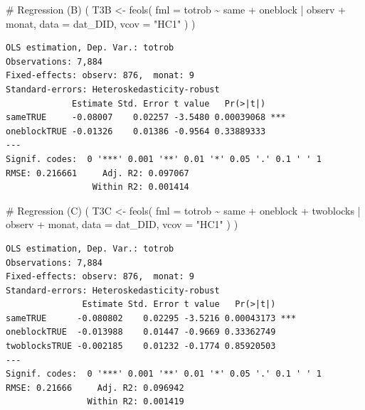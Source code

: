 \documentclass[
  a4paper,
  DIV=11,
  oneside]{scrreprt}
\newenvironment{Shaded}{\begin{snugshade}}{\end{snugshade}}
\newcommand{\AttributeTok}[1]{\textcolor[rgb]{0.40,0.45,0.13}{#1}}
\newcommand{\CommentTok}[1]{\textcolor[rgb]{0.37,0.37,0.37}{#1}}
\newcommand{\FunctionTok}[1]{\textcolor[rgb]{0.28,0.35,0.67}{#1}}
\newcommand{\NormalTok}[1]{\textcolor[rgb]{0.00,0.23,0.31}{#1}}
\newcommand{\OtherTok}[1]{\textcolor[rgb]{0.00,0.23,0.31}{#1}}
\newcommand{\SpecialCharTok}[1]{\textcolor[rgb]{0.37,0.37,0.37}{#1}}
\newcommand{\StringTok}[1]{\textcolor[rgb]{0.13,0.47,0.30}{#1}}
\begin{document}
\begin{Shaded}
\begin{Highlighting}[]
\CommentTok{\# Regression (B)}
\NormalTok{(}
\NormalTok{  T3B }\OtherTok{\textless{}{-}} \FunctionTok{feols}\NormalTok{(}
    \AttributeTok{fml =}\NormalTok{ totrob }\SpecialCharTok{\textasciitilde{}} 
\NormalTok{      same  }
    \SpecialCharTok{+}\NormalTok{ oneblock }
    \SpecialCharTok{|}\NormalTok{ observ }\SpecialCharTok{+}\NormalTok{ monat, }
    \AttributeTok{data =}\NormalTok{ dat\_DID, }
    \AttributeTok{vcov =} \StringTok{"HC1"}
\NormalTok{  )}
\NormalTok{)}
\end{Highlighting}
\end{Shaded}

\begin{verbatim}
OLS estimation, Dep. Var.: totrob
Observations: 7,884
Fixed-effects: observ: 876,  monat: 9
Standard-errors: Heteroskedasticity-robust 
             Estimate Std. Error t value   Pr(>|t|)    
sameTRUE     -0.08007    0.02257 -3.5480 0.00039068 ***
oneblockTRUE -0.01326    0.01386 -0.9564 0.33889333    
---
Signif. codes:  0 '***' 0.001 '**' 0.01 '*' 0.05 '.' 0.1 ' ' 1
RMSE: 0.216661     Adj. R2: 0.097067
                 Within R2: 0.001414
\end{verbatim}

\begin{Shaded}
\begin{Highlighting}[]
\CommentTok{\# Regression (C)}
\NormalTok{(}
\NormalTok{  T3C }\OtherTok{\textless{}{-}} \FunctionTok{feols}\NormalTok{(}
    \AttributeTok{fml =}\NormalTok{ totrob }\SpecialCharTok{\textasciitilde{}} 
\NormalTok{      same}
    \SpecialCharTok{+}\NormalTok{ oneblock }
    \SpecialCharTok{+}\NormalTok{ twoblocks }
    \SpecialCharTok{|}\NormalTok{ observ }\SpecialCharTok{+}\NormalTok{ monat, }
    \AttributeTok{data =}\NormalTok{ dat\_DID, }
    \AttributeTok{vcov =} \StringTok{"HC1"}
\NormalTok{  )}
\NormalTok{)}
\end{Highlighting}
\end{Shaded}

\begin{verbatim}
OLS estimation, Dep. Var.: totrob
Observations: 7,884
Fixed-effects: observ: 876,  monat: 9
Standard-errors: Heteroskedasticity-robust 
               Estimate Std. Error t value   Pr(>|t|)    
sameTRUE      -0.080802    0.02295 -3.5216 0.00043173 ***
oneblockTRUE  -0.013988    0.01447 -0.9669 0.33362749    
twoblocksTRUE -0.002185    0.01232 -0.1774 0.85920503    
---
Signif. codes:  0 '***' 0.001 '**' 0.01 '*' 0.05 '.' 0.1 ' ' 1
RMSE: 0.21666     Adj. R2: 0.096942
                Within R2: 0.001419
\end{verbatim}
\end{document}
